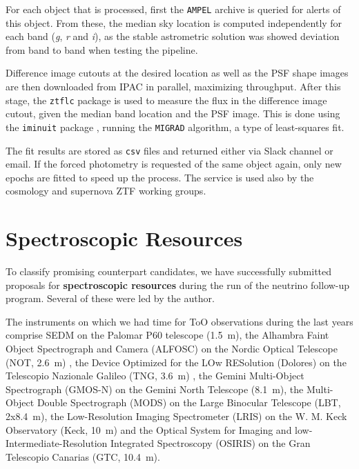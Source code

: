 For each object that is processed, first the \texttt{AMPEL} archive is queried for alerts of this object. From these, the median sky location is computed independently for each band (\textit{g}, \textit{r} and \textit{i}), as the stable astrometric solution was showed deviation from band to band when testing the pipeline.

Difference image cutouts at the desired location as well as the PSF shape images are then downloaded from IPAC in parallel, maximizing throughput. After this stage, the \texttt{ztflc} package is used to measure the flux in the difference image cutout, given the median band location and the PSF image. This is done using the \texttt{iminuit} package , running the \texttt{MIGRAD}  algorithm, a type of least-squares fit.

The fit results are stored as \texttt{csv} files and returned either via Slack channel or email. If the forced photometry is requested of the same object again, only new epochs are fitted to speed up the process. The service is used also by the cosmology and supernova ZTF working groups.

\section{Spectroscopic Resources}
To classify promising counterpart candidates, we have successfully submitted proposals for \textbf{spectroscopic resources} during the run of the neutrino follow-up program. Several of these were led by the author.

The instruments on which we had time for ToO observations during the last years comprise SEDM on the Palomar P60 telescope (\SI{1.5}{\meter}), the Alhambra Faint Object Spectrograph and Camera (ALFOSC) on the Nordic Optical Telescope (NOT, \SI{2.6}{\meter}) , the Device Optimized for the LOw RESolution (Dolores) on the Telescopio Nazionale Galileo (TNG, \SI{3.6}{\meter}) , the Gemini Multi-Object Spectrograph (GMOS-N)  on the Gemini North Telescope (\SI{8.1}{\meter}), the Multi-Object Double Spectrograph (MODS)  on the Large Binocular Telescope (LBT, 2x\SI{8.4}{\meter}), the Low-Resolution Imaging Spectrometer (LRIS)  on the W. M. Keck Observatory (Keck, \SI{10}{\meter}) and the Optical System for Imaging and low-Intermediate-Resolution Integrated Spectroscopy (OSIRIS)  on the Gran Telescopio Canarias (GTC, \SI{10.4}{\meter}).


